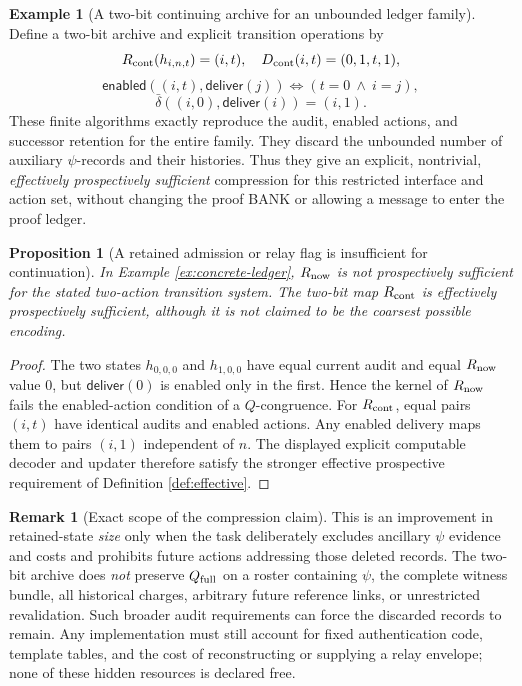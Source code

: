 \documentclass[11pt,letterpaper]{article}
\newtheorem{proposition}[theorem]{Proposition}
\theoremstyle{definition}
\newtheorem{example}[theorem]{Example}
\newtheorem{remark}[theorem]{Remark}
\begin{document}
\begin{example}[A two-bit continuing archive for an unbounded ledger family]
Define a two-bit archive and explicit transition operations by
\[
R_{\rm cont}(h_{i,n,t})=(i,t),\quad D_{\rm cont}(i,t)=(0,1,t,1),
\]
\[
\mathsf{enabled}((i,t),\mathsf{deliver}(j))\iff (t=0\ \wedge\ i=j),
\]
\[
\bar\delta((i,0),\mathsf{deliver}(i))=(i,1).
\]
These finite algorithms exactly reproduce the audit, enabled actions, and successor retention for the entire family. They discard the unbounded number of auxiliary $\psi$-records and their histories. Thus they give an explicit, nontrivial, \emph{effectively prospectively sufficient} compression for this restricted interface and action set, without changing the proof BANK or allowing a message to enter the proof ledger.
\end{example}

\begin{proposition}[A retained admission or relay flag is insufficient for continuation]\label{prop:concrete-obstruction}
In Example \ref{ex:concrete-ledger}, $R_{\rm now}$ is not prospectively sufficient for the stated two-action transition system. The two-bit map $R_{\rm cont}$ is effectively prospectively sufficient, although it is not claimed to be the coarsest possible encoding.
\end{proposition}
\begin{proof}
The two states $h_{0,0,0}$ and $h_{1,0,0}$ have equal current audit and equal $R_{\rm now}$ value $0$, but $\mathsf{deliver}(0)$ is enabled only in the first. Hence the kernel of $R_{\rm now}$ fails the enabled-action condition of a $Q$-congruence. For $R_{\rm cont}$, equal pairs $(i,t)$ have identical audits and enabled actions. Any enabled delivery maps them to pairs $(i,1)$ independent of $n$. The displayed explicit computable decoder and updater therefore satisfy the stronger effective prospective requirement of Definition \ref{def:effective}.
\end{proof}

\begin{remark}[Exact scope of the compression claim]
This is an improvement in retained-state \emph{size} only when the task deliberately excludes ancillary $\psi$ evidence and costs and prohibits future actions addressing those deleted records. The two-bit archive does \emph{not} preserve $Q_{\rm full}$ on a roster containing $\psi$, the complete witness bundle, all historical charges, arbitrary future reference links, or unrestricted revalidation. Such broader audit requirements can force the discarded records to remain. Any implementation must still account for fixed authentication code, template tables, and the cost of reconstructing or supplying a relay envelope; none of these hidden resources is declared free.
\end{remark}
\end{document}
